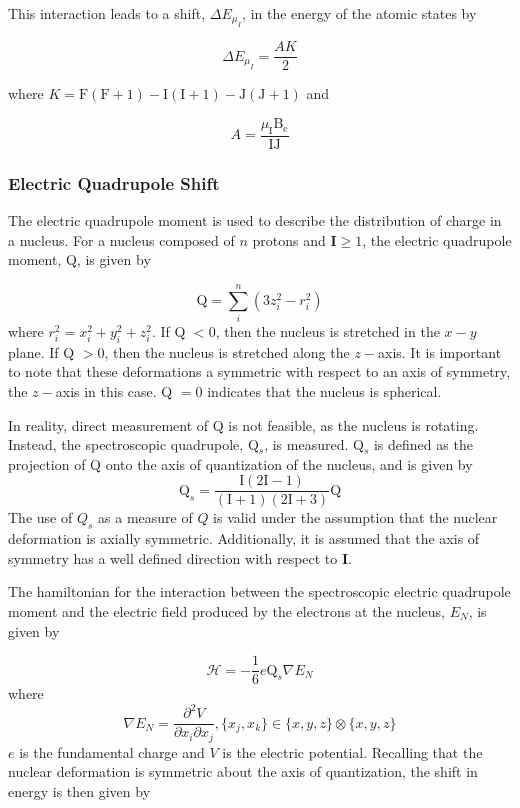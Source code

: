 \documentclass[12pt,a4paper,margin=1in]{book}
\begin{document}
This interaction leads to a shift, $\Delta E_{\mu_I}$, in the energy of the atomic states by

\begin{equation}
\Delta E_{\mu_I} = \frac{AK}{2}
\end{equation}

where $K = \mathrm{F(F+1) - I(I+1) - J(J+1)}$ and 

\begin{equation}
A = \frac{\mu_{\mathrm{I}}\mathrm{B_e}}{\mathrm{IJ}}
\end{equation}

\subsubsection*{Electric Quadrupole Shift}
The electric quadrupole moment is used to describe the distribution of charge in a nucleus. For a nucleus composed of $n$ protons and $\mathbf{I}\geq1$, the electric quadrupole moment, Q, is given by

\begin{equation}
\mathrm{Q} = \sum_i^n (3z_i^2-r_i^2)
\end{equation}
where $r_i^2 = x_i^2+y_i^2+z_i^2$. If Q $ < 0$, then the nucleus is stretched in the $x-y$ plane. If Q $ > 0$, then the nucleus is stretched along the $z-$axis. It is important to note that these deformations a symmetric with respect to an axis of symmetry, the $z-$axis in this case. Q $=0$ indicates that the nucleus is spherical. 

In reality, direct measurement of Q is not feasible, as the nucleus is rotating. Instead, the spectroscopic quadrupole, Q$_s$, is measured. Q$_s$ is defined as the projection of Q onto the axis of quantization of the nucleus, and is given by
\begin{equation}
\mathrm{Q}_s = \frac{\mathrm{I}(2\mathrm{I}-1)}{(\mathrm{I}+1)(2\mathrm{I}+3)}\mathrm{Q}
\end{equation}
The use of $Q_s$ as a measure of $Q$ is valid under the assumption that the nuclear deformation is axially symmetric. Additionally, it is assumed that the axis of symmetry has a well defined direction with respect to \textbf{I}.

The hamiltonian for the interaction between the spectroscopic electric quadrupole moment and the electric field produced by the electrons at the nucleus, $E_N$, is given by

\begin{equation}
\mathcal{H} = - \frac{1}{6}e\mathrm{Q}_s\nabla{E_N}
\end{equation}
where
\begin{equation}
\nabla{E_N} = \frac{\partial^2V}{\partial x_i\partial x_j}, \{x_j,x_k\} \in \{x,y,z\} \otimes \{x,y,z\}
\end{equation}
$e$ is the fundamental charge and $V$ is the electric potential. Recalling that the nuclear deformation is symmetric about the axis of quantization, the shift in energy is then given by
\end{document}
